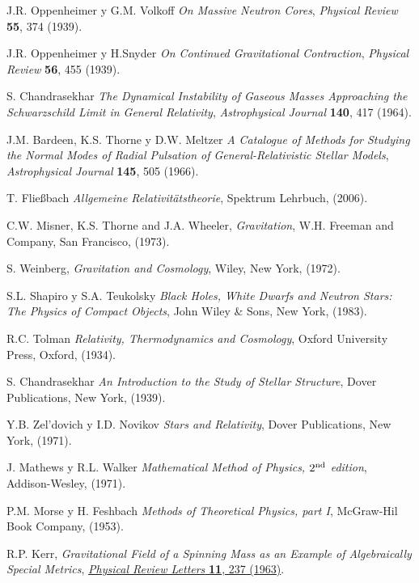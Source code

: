 \begin{thebibliography}{99}
 J.R. Oppenheimer y G.M. Volkoff {\em On Massive Neutron Cores}, {\sl Physical Review} {\bf 55}, 374 (1939).

 J.R. Oppenheimer y H.Snyder {\em On Continued Gravitational Contraction}, {\sl Physical Review} {\bf 56}, 455 (1939).

 S. Chandrasekhar {\em The Dynamical Instability of Gaseous Masses Approaching the Schwarzschild Limit in General Relativity}, {\sl Astrophysical Journal} {\bf 140}, 417 (1964).

 J.M. Bardeen, K.S. Thorne y D.W. Meltzer {\em A Catalogue of Methods for Studying the Normal Modes of Radial Pulsation of General-Relativistic Stellar Models}, {\sl Astrophysical Journal} {\bf 145}, 505 (1966).

 T. Flie\ss bach {\em Allgemeine Relativit\"atstheorie}, Spektrum Lehrbuch, (2006).

 C.W. Misner, K.S. Thorne and J.A. Wheeler, {\em Gravitation},
W.H. Freeman and Company, San Francisco, (1973).

 S. Weinberg, {\em Gravitation and Cosmology}, Wiley, New
York, (1972).

 S.L. Shapiro y S.A. Teukolsky {\em Black Holes, White Dwarfs and Neutron Stars: The Physics of Compact Objects}, John Wiley \& Sons, New York, (1983).

 R.C. Tolman {\em Relativity, Thermodynamics and Cosmology}, Oxford University Press, Oxford, (1934).

 S. Chandrasekhar {\em An Introduction to the Study of Stellar Structure}, Dover Publications, New York, (1939).


 Y.B. Zel'dovich y I.D. Novikov {\em Stars and Relativity}, Dover Publications, New York, (1971).

 J. Mathews y R.L. Walker {\em Mathematical Method of Physics, $2^{\rm nd}$ edition}, Addison-Wesley, (1971).

 P.M. Morse y H. Feshbach {\em Methods of Theoretical Physics, part I}, McGraw-Hil Book Company,  (1953).

 R.P. Kerr, {\em Gravitational Field of a Spinning Mass as an Example of Algebraically Special Metrics}, \href{https://doi.org/10.1103/PhysRevLett.11.237}{{\sl Physical Review Letters } {\bf 11}, 237 (1963)}.


\end{thebibliography}
